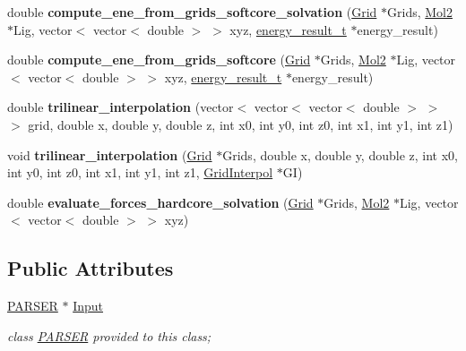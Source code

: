 \begin{DoxyCompactItemize}
\item 
\hypertarget{classEnergy2_af318343551e84e01b35677d1ef56c9d9}{
double {\bfseries compute\_\-ene\_\-from\_\-grids\_\-softcore\_\-solvation} (\hyperlink{classGrid}{Grid} $\ast$Grids, \hyperlink{classMol2}{Mol2} $\ast$Lig, vector$<$ vector$<$ double $>$ $>$ xyz, \hyperlink{structenergy__result__t}{energy\_\-result\_\-t} $\ast$energy\_\-result)}
\label{classEnergy2_af318343551e84e01b35677d1ef56c9d9}

\item 
\hypertarget{classEnergy2_a569533dd35443958603e94777e0cdb37}{
double {\bfseries compute\_\-ene\_\-from\_\-grids\_\-softcore} (\hyperlink{classGrid}{Grid} $\ast$Grids, \hyperlink{classMol2}{Mol2} $\ast$Lig, vector$<$ vector$<$ double $>$ $>$ xyz, \hyperlink{structenergy__result__t}{energy\_\-result\_\-t} $\ast$energy\_\-result)}
\label{classEnergy2_a569533dd35443958603e94777e0cdb37}

\item 
\hypertarget{classEnergy2_a4d6f5584b85e8557c6e77c678c59cb9a}{
double {\bfseries trilinear\_\-interpolation} (vector$<$ vector$<$ vector$<$ double $>$ $>$ $>$ grid, double x, double y, double z, int x0, int y0, int z0, int x1, int y1, int z1)}
\label{classEnergy2_a4d6f5584b85e8557c6e77c678c59cb9a}

\item 
\hypertarget{classEnergy2_a8f9f19efb62791a6bff5b297e42b2f24}{
void {\bfseries trilinear\_\-interpolation} (\hyperlink{classGrid}{Grid} $\ast$Grids, double x, double y, double z, int x0, int y0, int z0, int x1, int y1, int z1, \hyperlink{structEnergy2_1_1GridInterpol}{GridInterpol} $\ast$GI)}
\label{classEnergy2_a8f9f19efb62791a6bff5b297e42b2f24}

\item 
\hypertarget{classEnergy2_a16b42e7830b50eb81c0b1b7bf627135d}{
double {\bfseries evaluate\_\-forces\_\-hardcore\_\-solvation} (\hyperlink{classGrid}{Grid} $\ast$Grids, \hyperlink{classMol2}{Mol2} $\ast$Lig, vector$<$ vector$<$ double $>$ $>$ xyz)}
\label{classEnergy2_a16b42e7830b50eb81c0b1b7bf627135d}

\end{DoxyCompactItemize}
\subsection*{Public Attributes}
\begin{DoxyCompactItemize}
\item 
\hypertarget{classEnergy2_a377af6b19cbb3aef542421616c7918c2}{
\hyperlink{classPARSER}{PARSER} $\ast$ \hyperlink{classEnergy2_a377af6b19cbb3aef542421616c7918c2}{Input}}
\label{classEnergy2_a377af6b19cbb3aef542421616c7918c2}

\begin{DoxyCompactList}\small\item\em class \hyperlink{classPARSER}{PARSER} provided to this class; \item\end{DoxyCompactList}\end{DoxyCompactItemize}


